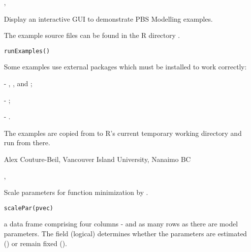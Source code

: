 \documentclass[letterpaper]{book}
\begin{document}
%
\begin{SeeAlso}\relax
{}, 
\end{SeeAlso}
%
\begin{Description}\relax
Display an interactive GUI to demonstrate PBS Modelling examples.

The example source files can be found in the R directory 
.
\end{Description}
%
\begin{Usage}
\begin{verbatim}
runExamples()
\end{verbatim}
\end{Usage}
%
\begin{Details}\relax
Some examples use external packages which must be installed to work correctly:

 - , , and ;

 - ;

 - .
\end{Details}
%
\begin{Note}\relax
The examples are copied from  to R's current 
temporary working directory and run from there.
\end{Note}
%
\begin{Author}\relax
Alex Couture-Beil, Vancouver Island University, Nanaimo BC
\end{Author}
%
\begin{SeeAlso}\relax
{}, 
\end{SeeAlso}
%
\begin{Description}\relax
Scale parameters for function minimization by .
\end{Description}
%
\begin{Usage}
\begin{verbatim}
scalePar(pvec)
\end{verbatim}
\end{Usage}
%
\begin{Arguments}
\begin{ldescription}
\item[\code{pvec}] a data frame comprising four columns - 
 and as many rows as there are model
parameters. The  field (logical) determines whether the 
parameters are estimated () or remain fixed ().
\end{ldescription}
\end{Arguments}
\end{document}
